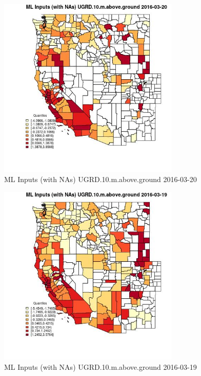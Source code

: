 \clearpage 

\begin{figure} 
\centering  
\includegraphics[width=0.77\textwidth]{Code_Outputs/Report_ML_input_PM25_Step4_part_e_de_duplicated_aveswNAs_CountyUGRD10mabovegroundMean2016-03-20_2016-03-20.jpg} 
\caption{\label{fig:Report_ML_input_PM25_Step4_part_e_de_duplicated_aveswNAsCountyUGRD10mabovegroundMean2016-03-20_2016-03-20}ML Inputs (with NAs) UGRD.10.m.above.ground 2016-03-20} 
\end{figure} 
 

\begin{figure} 
\centering  
\includegraphics[width=0.77\textwidth]{Code_Outputs/Report_ML_input_PM25_Step4_part_e_de_duplicated_aveswNAs_CountyUGRD10mabovegroundMean2016-03-19_2016-03-19.jpg} 
\caption{\label{fig:Report_ML_input_PM25_Step4_part_e_de_duplicated_aveswNAsCountyUGRD10mabovegroundMean2016-03-19_2016-03-19}ML Inputs (with NAs) UGRD.10.m.above.ground 2016-03-19} 
\end{figure} 
 

